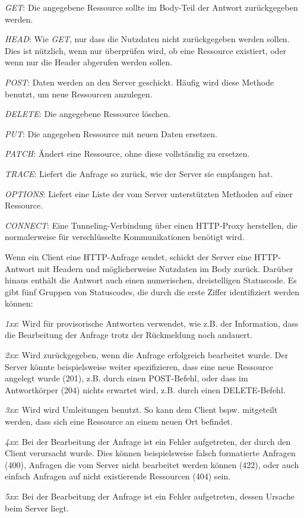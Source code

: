 \begin{description}
	\item \emph{GET}: Die angegebene Ressource sollte im Body-Teil der Antwort zurückgegeben werden.
	\item \emph{HEAD}: Wie \emph{GET}, nur dass die Nutzdaten nicht zurückgegeben werden sollen. Dies ist nützlich, wenn nur überprüfen wird, ob eine Ressource existiert, oder wenn nur die Header abgerufen werden sollen.
	\item \emph{POST}: Daten werden an den Server geschickt. Häufig wird diese Methode benutzt, um neue Ressourcen anzulegen.
	\item \emph{DELETE}: Die angegebene Ressource löschen.
	\item \emph{PUT}: Die angegeben Ressource mit neuen Daten ersetzen.
	\item \emph{PATCH}: Ändert eine Ressource, ohne diese vollständig zu ersetzen.
	\item \emph{TRACE}: Liefert die Anfrage so zurück, wie der Server sie empfangen hat.
	\item \emph{OPTIONS}: Liefert eine Liste der vom Server unterstützten Methoden auf einer Ressource.
	\item \emph{CONNECT}: Eine Tunneling-Verbindung über einen HTTP-Proxy herstellen, die normalerweise für verschlüsselte Kommunikationen benötigt wird.
\end{description}

Wenn ein Client eine HTTP-Anfrage sendet, schickt der Server eine HTTP-Antwort mit Headern und möglicherweise Nutzdaten im Body zurück. Darüber hinaus enthält die Antwort auch einen numerischen, dreistelligen Statuscode. Es gibt fünf Gruppen von Statuscodes, die durch die erste Ziffer identifiziert werden können:

\begin{description}
	\item \emph{1xx}: Wird für provisorische Antworten verwendet, wie z.B. der Information, dass die Bearbeitung der Anfrage trotz der Rückmeldung noch andauert.
	\item \emph{2xx}: Wird zurückgegeben, wenn die Anfrage erfolgreich bearbeitet wurde. Der Server könnte beispielsweise weiter spezifizieren, dass eine neue Ressource angelegt wurde (201), z.B. durch einen POST-Befehl, oder dass im Antwortkörper (204) nichts erwartet wird, z.B. durch einen DELETE-Befehl.
	\item \emph{3xx}: Wird wird Umleitungen benutzt. So kann dem Client bspw. mitgeteilt werden, dass sich eine Ressource an einem neuen Ort befindet.
	\item \emph{4xx}: Bei der Bearbeitung der Anfrage ist ein Fehler aufgetreten, der durch den Client verursacht wurde. Dies können beispielsweise falsch formatierte Anfragen (400), Anfragen die vom Server nicht bearbeitet werden können (422), oder auch einfach Anfragen auf nicht existierende Ressourcen (404) sein.
	\item \emph{5xx}: Bei der Bearbeitung der Anfrage ist ein Fehler aufgetreten, dessen Ursache beim Server liegt. 
\end{description}



